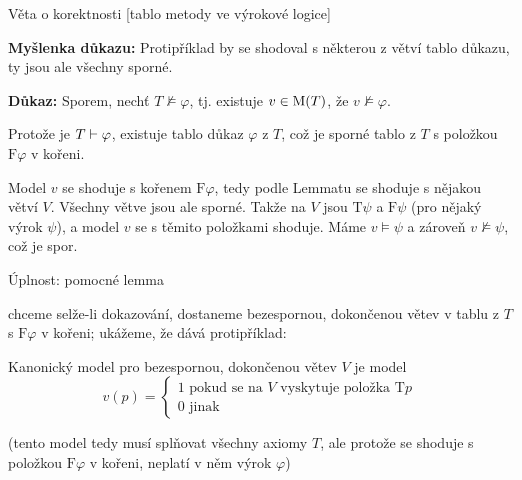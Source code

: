 \documentclass{beamer}
\begin{document}
\begin{frame}{Věta o korektnosti [tablo metody ve výrokové logice]}


    \medskip

    \textbf{Myšlenka důkazu:} Protipříklad by se shodoval s některou z větví tablo důkazu, ty jsou ale všechny sporné.

    \medskip

    \textbf{Důkaz:} Sporem, nechť $T\not\models\varphi$, tj. existuje $v\in\operatorname{M}(T)$, že $v\not\models\varphi$.
        
    Protože je $T\vdash\varphi$, existuje tablo důkaz $\varphi$ z $T$, což je sporné tablo z $T$ s položkou $\mathrm{F}\varphi$ v kořeni. 
        
    Model $v$ se shoduje s kořenem $\mathrm{F}\varphi$, tedy podle Lemmatu se shoduje s nějakou větví $V$. Všechny větve jsou ale sporné. Takže na $V$ jsou $\mathrm{T}\psi$ a $\mathrm{F}\psi$ (pro nějaký výrok $\psi$), a model $v$ se s těmito položkami shoduje. Máme $v\models\psi$ a zároveň $v\not\models\psi$, což je spor.\hfill\qedsymbol

\end{frame}


\begin{frame}{Úplnost: pomocné lemma}

    chceme selže-li dokazování, dostaneme \alert{bezespornou, dokončenou} větev v tablu z $T$ s $\mathrm{F}\varphi$ v kořeni; ukážeme, že dává protipříklad:

    \alert{Kanonický model} pro bezespornou, dokončenou větev $V$ je model
    $$
    v(p)=\begin{cases}
        1 \text{ pokud se na $V$ vyskytuje položka $\mathrm{T}p$}\\
        0 \text{ jinak}
    \end{cases}
    $$  
    
    \medskip


    \bigskip
    
    (tento model tedy musí splňovat všechny axiomy $T$, ale protože se shoduje s položkou $\mathrm{F}\varphi$ v kořeni, neplatí v něm výrok $\varphi$)

\end{frame}
\end{document}
